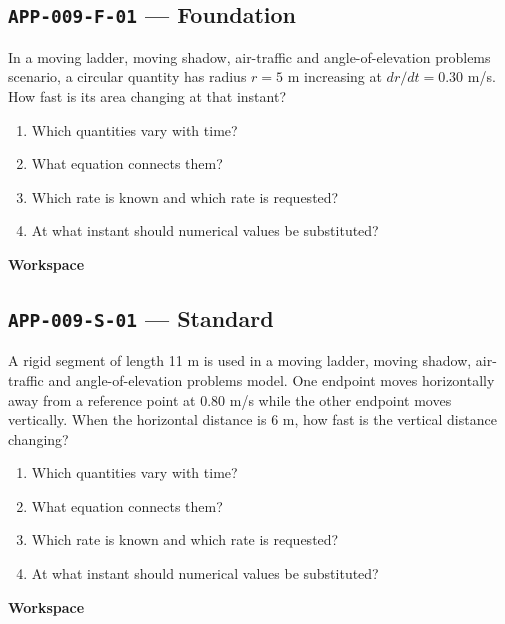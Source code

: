 \documentclass[11pt]{book}
\newcommand{\pid}[1]{\texttt{#1}}
\newcommand{\workspace}{\par\vspace{0.7in}\hrulefill\par\vspace{0.55in}\hrulefill\par}
\begin{document}
\subsection*{\pid{APP-009-F-01} — Foundation}
\begin{problembox}
In a moving ladder, moving shadow, air-traffic and angle-of-elevation problems scenario, a circular quantity has radius $r=5$ m increasing at $dr/dt=0.30$ m/s. How fast is its area changing at that instant?
\end{problembox}
\begin{promptbox}\begin{enumerate}
\item Which quantities vary with time?
\item What equation connects them?
\item Which rate is known and which rate is requested?
\item At what instant should numerical values be substituted?
\end{enumerate}\end{promptbox}
\textbf{Workspace}\workspace
{}
\subsection*{\pid{APP-009-S-01} — Standard}
\begin{problembox}
A rigid segment of length 11 m is used in a moving ladder, moving shadow, air-traffic and angle-of-elevation problems model. One endpoint moves horizontally away from a reference point at 0.80 m/s while the other endpoint moves vertically. When the horizontal distance is 6 m, how fast is the vertical distance changing?
\end{problembox}
\begin{promptbox}\begin{enumerate}
\item Which quantities vary with time?
\item What equation connects them?
\item Which rate is known and which rate is requested?
\item At what instant should numerical values be substituted?
\end{enumerate}\end{promptbox}
\textbf{Workspace}\workspace
{}
\end{document}

